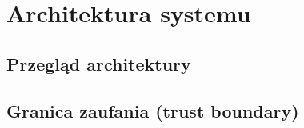 \chapter{Architektura systemu}\label{ch:architektura}


\section{Przegląd architektury}\label{sec:architektura-przeglad}

%
%
%
%

\section{Granica zaufania (trust boundary)}\label{sec:trust-boundary}

%
%
%
%
%

